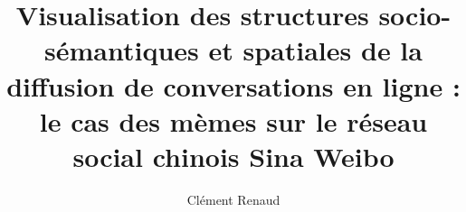 \title{Visualisation des structures socio-sémantiques et spatiales de la diffusion de conversations en ligne : le cas des mèmes sur le réseau social chinois Sina Weibo}
\author{Clément Renaud}





